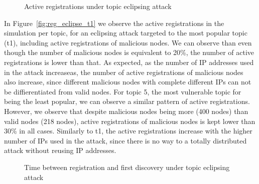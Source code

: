 \begin{figure}[!h]
\centering
{} 
\hspace{-0.15cm}
 \caption{Active registrations under topic eclipsing attack} 
\label{fig:reg_eclipse}
\vspace{-0.15in}
\end{figure}   

In Figure~\ref{fig:reg_eclipse_t1} we observe the active registrations in the simulation per topic, for an eclipsing attack targeted to the most popular topic (t1), including active registrations of malicious nodes.
We can observe than even though the number of malicious nodes is equivalent to 20\%, the number of active registrations is lower than that. 
As expected, as the number of IP addresses used in the attack increaseas, the number of active registrations of malicious nodes also increase, since different malicious nodes with complete different IPs can not be diffierentiated from valid nodes.
For topic 5, the most vulnerable topic for being the least popular, we can observe a similar pattern of active registrations. 
However, we observe that despite malicious nodes being more (400 nodes) than valid nodes (218 nodes), active registrations of malicious nodes is kept lower than 30\% in all cases. Similarly to t1, the active registrations increase with the higher number of IPs used in the attack, since there is no way to a totally distributed attack without reusing IP addresses.


\begin{figure}[!h]
\centering
{} 
\hspace{-0.16cm}
 \caption{Time between registration and first discovery under topic eclipsing attack} 
\label{fig:discoverytime_eclipse}
\vspace{-0.15in}
\end{figure}   

